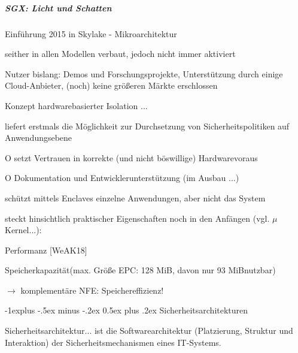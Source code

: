 \documentclass[a4paper]{article}
\makeatletter
\newcommand{\cmark}{\ding{51}}
\newcommand{\xmark}{\ding{55}}
\renewcommand{\subsection}{\@startsection{subsection}{2}{0mm}%
 {-1explus -.5ex minus -.2ex}%
 {0.5ex plus .2ex}%
 {\normalfont\normalsize\bfseries}}
\makeatother
\begin{document}
\begin{multicols}{3}
    \subparagraph{SGX: Licht und Schatten}

    \begin{itemize*}
        \item
        Einführung 2015 in Skylake - Mikroarchitektur
        \item
        seither in allen Modellen verbaut, jedoch nicht immer aktiviert
        \item
        Nutzer bislang: Demos und Forschungsprojekte, Unterstützung durch
        einige Cloud-Anbieter, (noch) keine größeren Märkte erschlossen
        \item
        Konzept hardwarebasierter Isolation ...
        \begin{itemize*}
            \item \cmark liefert erstmals die Möglichkeit zur Durchsetzung von Sicherheitspolitiken auf Anwendungsebene
            \item O setzt Vertrauen in korrekte (und nicht böswillige) Hardwarevoraus
            \item O Dokumentation und Entwicklerunterstützung (im Ausbau ...)
            \item \xmark schützt mittels Enclaves einzelne Anwendungen, aber nicht das System
            \item \xmark steckt hinsichtlich praktischer Eigenschaften noch in den Anfängen (vgl. $\mu$Kernel...): \begin{itemize*} \item Performanz [WeAK18] \item Speicherkapazität(max. Größe EPC: 128 MiB, davon nur 93 MiBnutzbar) \item[$\rightarrow$] komplementäre NFE: Speichereffizienz! \end{itemize*}
        \end{itemize*}
    \end{itemize*}


    \subsection{Sicherheitsarchitekturen}

    Sicherheitsarchitektur... ist die Softwarearchitektur (Platzierung,
    Struktur und Interaktion) der Sicherheitsmechanismen eines IT-Systems.


\end{multicols}
\end{document}
